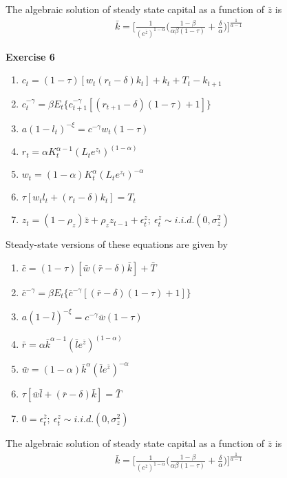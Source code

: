 \documentclass[letterpaper,12pt]{article}
\begin{document}
The algebraic solution of steady state capital as a function of $\bar{z}$ is
\begin{align*}
\bar{k} = 
\Big[ \frac{1}{(e^{\bar{z}})^{1-\alpha}} \Big( \frac{1-\beta}{\alpha\beta(1-\tau)} + \frac{\delta}{\alpha} \Big) \Big] ^{\frac{1}{\alpha - 1}}
\end{align*}

\textbf{Exercise 6}

\begin{enumerate}
	\item $c_t = (1 - \tau)[w_t (r_t - \delta) k_t] + k_t + T_t - k_{t+1}$
	\item $c_t^{-\gamma} = \beta E_t \{c_{t+1}^{-\gamma} [(r_{t+1} - \delta)(1 - \tau) + 1]\}$
	\item $a(1-l_t)^{-\xi} = c^{-\gamma} w_t (1 - \tau)$
	\item $r_t = \alpha K_t^{\alpha-1} (L_t e^{z_t})^{(1 - \alpha)}$
	\item $w_t = (1 - \alpha) K_t^\alpha (L_t e^{z_t}) ^{-\alpha}$
	\item $\tau[w_t l_t + (r_t - \delta) k_t] = T_t$
	\item $z_t = (1 - \rho_z) \bar{z} + \rho_z z_{t-1} + \epsilon_t^z; \ \epsilon_t^z \sim i.i.d.(0, \sigma_z^2)$
\end{enumerate}

Steady-state versions of these equations are given by
\begin{enumerate}
	\item $\bar{c} = (1 - \tau)[\bar{w} (\bar{r} - \delta) \bar{k}]  + \bar{T} $
	\item $\bar{c}^{-\gamma} = \beta E_t \{\bar{c}^{-\gamma} [(\bar{r} - \delta)(1 - \tau) + 1]\}$
	\item $a(1-\bar{l})^{-\xi} = c^{-\gamma} \bar{w} (1 - \tau)$
	\item $\bar{r} = \alpha \bar{k}^{\alpha-1} (\bar{l} e^{\bar{z}})^{(1 - \alpha)}$
	\item $\bar{w} = (1 - \alpha) \bar{k}^\alpha (\bar{l} e^{\bar{z}}) ^{-\alpha}$
	\item $\tau[\bar{w} \bar{l} + (\bar{r} - \delta) \bar{k}] = \bar{T}$
	\item $0 = \epsilon_t^{\bar{z}}; \ \epsilon_t^z \sim i.i.d.(0, \sigma_z^2)$
\end{enumerate}

The algebraic solution of steady state capital as a function of $\bar{z}$ is
\begin{align*}
\bar{k} = 
\Big[ \frac{1}{(e^{\bar{z}})^{1-\alpha}} \Big( \frac{1-\beta}{\alpha\beta(1-\tau)} + \frac{\delta}{\alpha} \Big) \Big] ^{\frac{1}{\alpha - 1}}
\end{align*}
\end{document}
